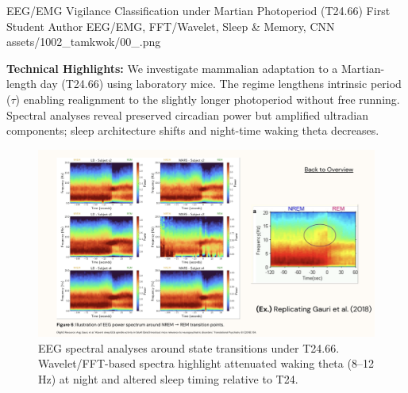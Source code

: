 \ProjectEntry
{EEG/EMG Vigilance Classification under Martian Photoperiod (T24.66)}
{First Student Author}
{EEG/EMG, FFT/Wavelet, Sleep \& Memory, CNN}
{
}
{assets/1002_tamkwok/00_.png}
{ \quad {}}
{ }

\vspace{1em}

\textbf{Technical Highlights:}
We investigate mammalian adaptation to a Martian-length day (T24.66) using laboratory mice. The regime lengthens intrinsic period (\(\tau\)) enabling realignment to the slightly longer photoperiod without free running. Spectral analyses reveal preserved circadian power but amplified ultradian components; sleep architecture shifts and night-time waking theta decreases.

\begin{figure}[ht]
  \centering
  \includegraphics[width=0.85\linewidth]{assets/1002_tamkwok/01_.png}
  \caption{EEG spectral analyses around state transitions under T24.66. Wavelet/FFT-based spectra highlight attenuated waking theta (8--12 Hz) at night and altered sleep timing relative to T24.}
  \label{fig:t2466_spectra}
\end{figure}

